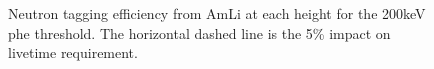 \begin{figure}[!htbp]
    \caption{Neutron tagging efficiency from AmLi at each height for the 200keV phe threshold.
    The horizontal dashed line is the 5\% impact on livetime requirement.}
    \label{fig:commissioning_amli_efficiency_with_bg_rate}
\end{figure}